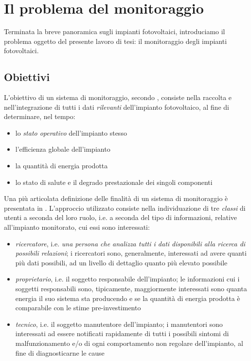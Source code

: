 %
\chapter{Il problema del monitoraggio}
Terminata la breve panoramica sugli impianti fotovoltaici, introduciamo il 
problema oggetto del presente lavoro di tesi: il monitoraggio degli 
impianti fotovoltaici.
%

%
\section{Obiettivi}
L'obiettivo di un sistema di monitoraggio, secondo \cite{dirks06}, consiste 
nella raccolta e nell'integrazione di tutti i dati \emph{rilevanti} dell'impianto 
fotovoltaico, al fine di determinare, nel tempo:
%
\begin{itemize}
\item lo \emph{stato operativo} dell'impianto stesso
\item l'efficienza globale dell'impianto
\item la quantit\`a di energia prodotta
\item lo stato di salute e il degrado prestazionale dei singoli componenti
\end{itemize}
%

%
Una pi\`u articolata definizione delle finalit\`a di un sistema di monitoraggio
\`e presentata in \cite{kolodenny08}. L'approccio utilizzato consiste nella 
individuazione di tre \emph{classi} di utenti a seconda del loro ruolo, i.e.
a seconda del tipo di informazioni, relative all'impianto monitorato,
cui essi sono interessati:
%
\begin{itemize}
\item \emph{ricercatore}, i.e. \emph{una persona che analizza tutti i dati disponibili 
alla ricerca di possibili relazioni}; i ricercatori sono, generalmente, interessati 
ad avere quanti pi\`u dati possibili, ad un livello di dettaglio quanto pi\`u elevato
possibile
%
\item \emph{proprietario}, i.e. il soggetto responsabile dell'impianto; le informazioni
cui i soggetti responsabili sono, tipicamente, maggiormente interessati sono 
quanta energia il suo sistema sta producendo e  se la quantit\`a di energia 
prodotta \`e comparabile con le stime pre-investimento
%
\item \emph{tecnico}, i.e. il soggetto manutentore dell'impianto; i manutentori sono
interessati ad essere notificati rapidamente di tutti i possibili sintomi di malfunzionamento 
e/o di ogni comportamento non regolare dell'impianto, al fine di diagnosticarne le cause
\end{itemize}
%


